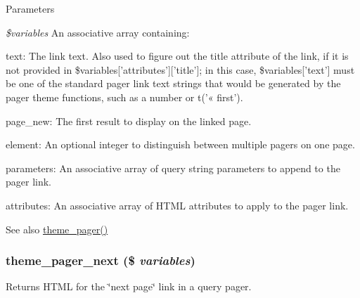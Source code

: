 \begin{DoxyParams}{Parameters}
\item[{\em \$variables}]An associative array containing:
\begin{DoxyItemize}
\item text: The link text. Also used to figure out the title attribute of the link, if it is not provided in \$variables\mbox{[}'attributes'\mbox{]}\mbox{[}'title'\mbox{]}; in this case, \$variables\mbox{[}'text'\mbox{]} must be one of the standard pager link text strings that would be generated by the pager theme functions, such as a number or t('« first').
\item page\_\-new: The first result to display on the linked page.
\item element: An optional integer to distinguish between multiple pagers on one page.
\item parameters: An associative array of query string parameters to append to the pager link.
\item attributes: An associative array of HTML attributes to apply to the pager link.
\end{DoxyItemize}\end{DoxyParams}
\begin{DoxySeeAlso}{See also}
\hyperlink{group__themeable_ga3bfc8e62230af3fb60b061ee67c6d045}{theme\_\-pager()} 
\end{DoxySeeAlso}
\hypertarget{group__themeable_ga36f1c652a53b2d4df284cdae21dc87a0}{
\subsubsection[{theme\_\-pager\_\-next}]{\setlength{\rightskip}{0pt plus 5cm}theme\_\-pager\_\-next (\$ {\em variables})}}
\label{group__themeable_ga36f1c652a53b2d4df284cdae21dc87a0}
Returns HTML for the \char`\"{}next page\char`\"{} link in a query pager.


